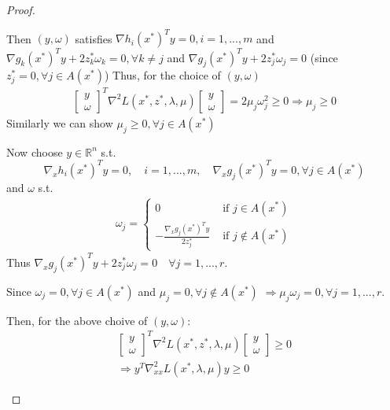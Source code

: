 \documentclass[11pt,a4paper]{article}
\begin{document}
\begin{proof}
\begin{enumerate}[(1)]
    Then $(y,\omega)$ satisfies $\nabla h_i(x^*)^Ty=0,i=1,...,m$ and $\nabla g_k(x^*)^Ty+2z^*_k\omega_k=0,\forall k\neq j$ and $\nabla g_j(x^*)^Ty+2z_j^*\omega_j=0$ (since $z_j^*=0,\forall j\in A(x^*)$)
    Thus, for the choice of $(y,\omega)$
    \begin{equation}
        \begin{aligned}
            \begin{bmatrix}
                y\\
                \omega
            \end{bmatrix}^T \nabla^2L(x^*,z^*,\lambda,\mu)\begin{bmatrix}
                y\\
                \omega
            \end{bmatrix}=2\mu_j\omega_j^2\geq 0 \Rightarrow \mu_j\geq 0
        \end{aligned}
        \nonumber
    \end{equation}
    Similarly we can show $\mu_j\geq 0,\forall j\in A(x^*)$

    Now choose $y\in \mathbb{R}^n$ s.t. $$\nabla_x h_i(x^*)^T y=0,\quad i=1,...,m,\quad \nabla_x g_j(x^*)^T y=0,\forall j\in A(x^*)$$
    and $\omega$ s.t.
    \begin{equation}
        \begin{aligned}
            \omega_j=\left\{\begin{matrix}
                0&\text{ if }j\in A(x^*)\\
                -\frac{\nabla_x g_j(x^*)^T y}{2z_j^*}&\text{ if }j\notin A(x^*)
            \end{matrix}\right.
        \end{aligned}
        \nonumber
    \end{equation}
    Thus $\nabla_x g_j(x^*)^T y+2z_j^*\omega_j=0\quad \forall j=1,...,r$.
    
    Since $\omega_j=0,\forall j\in A(x^*)$ and $\mu_j=0,\forall j\notin A(x^*)$ $\Rightarrow \mu_j\omega_j=0,\forall j=1,...,r$.

    Then, for the above choive of $(y,\omega)$:
    \begin{equation}
        \begin{aligned}
            \begin{bmatrix}
                y\\
                \omega
            \end{bmatrix}^T \nabla^2L(x^*,z^*,\lambda,\mu)\begin{bmatrix}
                y\\
                \omega
            \end{bmatrix}\geq 0\\
            \Rightarrow	 y^T \nabla^2_{xx}L(x^*,\lambda,\mu)y\geq 0
        \end{aligned}
        \nonumber
    \end{equation}
\end{enumerate}

\end{proof}
\end{document}
